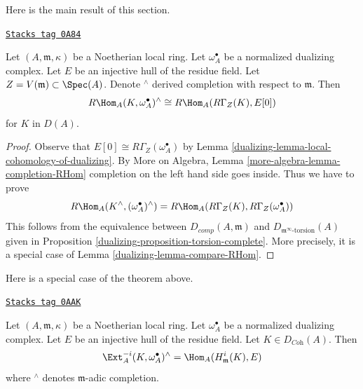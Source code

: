 Here is the main result of this section.

\begin{theorem}
\label{dualizing-theorem-local-duality}
\href{https://stacks.math.columbia.edu/tag/0A84}{\texttt{Stacks tag 0A84}}

Let $(A, \mathfrak m, \kappa)$ be a Noetherian local ring.
Let $\omega_A^\bullet$ be a normalized dualizing complex.
Let $E$ be an injective hull of the residue field.
Let $Z = V(\mathfrak m) \subset \Spec(A)$.
Denote ${}^\wedge$ derived completion with respect to $\mathfrak m$.
Then
$$
R\Hom_A(K, \omega_A^\bullet)^\wedge \cong R\Hom_A(R\Gamma_Z(K), E[0])
$$
for $K$ in $D(A)$.
\end{theorem}

\begin{proof}

Observe that $E[0] \cong R\Gamma_Z(\omega_A^\bullet)$ by
Lemma \ref{dualizing-lemma-local-cohomology-of-dualizing}.
By More on Algebra, Lemma \ref{more-algebra-lemma-completion-RHom}
completion on the left hand side goes inside.
Thus we have to prove
$$
R\Hom_A(K^\wedge, (\omega_A^\bullet)^\wedge)
=
R\Hom_A(R\Gamma_Z(K), R\Gamma_Z(\omega_A^\bullet))
$$
This follows from the equivalence between
$D_{comp}(A, \mathfrak m)$ and $D_{\mathfrak m^\infty\text{-torsion}}(A)$
given in Proposition \ref{dualizing-proposition-torsion-complete}.
More precisely, it is a special case of Lemma \ref{dualizing-lemma-compare-RHom}.
\end{proof}

Here is a special case of the theorem above.

\begin{lemma}
\label{dualizing-lemma-special-case-local-duality}
\href{https://stacks.math.columbia.edu/tag/0AAK}{\texttt{Stacks tag 0AAK}}

Let $(A, \mathfrak m, \kappa)$ be a Noetherian local ring.
Let $\omega_A^\bullet$ be a normalized dualizing complex.
Let $E$ be an injective hull of the residue field.
Let $K \in D_{\textit{Coh}}(A)$. Then
$$
\Ext^{-i}_A(K, \omega_A^\bullet)^\wedge =
\Hom_A(H^i_{\mathfrak m}(K), E)
$$
where ${}^\wedge$ denotes $\mathfrak m$-adic completion.
\end{lemma}

